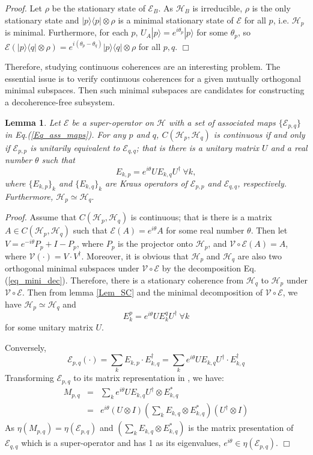 \documentclass[journal]{IEEEtran}
\def\h{\ensuremath{\mathcal{H}}}
\def\v{\ensuremath{\mathcal{V}}}
\def\e{\ensuremath{\mathcal{E}}}
\newtheorem{lemma}{Lemma}
\begin{document}
{\it Proof.} Let $\rho$ be the stationary state of $\e_B$. As $\h_B$ is irreducible, $\rho$ is the only stationary state and $|p\rangle\langle p|\otimes \rho$ is a minimal stationary state of $\e$ for all $p$, i.e. $\h_p$ is minimal. Furthermore, for each $p$, $U_A|p\rangle=e^{i\theta_p}|p\rangle$ for some $\theta_p$, so  $\e(|p\rangle\langle q|\otimes \rho)=e^{i(\theta_p-\theta_q)}|p\rangle\langle q|\otimes \rho$ for all $p,q.$
\hfill $\Box$

Therefore, studying continuous coherences are an interesting problem. The essential issue is to verify continuous coherences for a given mutually orthogonal minimal subspaces. Then such minimal subspaces are candidates for constructing a decoherence-free subsystem.
\begin{lemma}\label{lem_block_eq}
  Let $\e$ be a super-operator on $\h$ with a set of associated maps $\{\e_{p,q}\}$ in Eq.(\ref{Eq_ass_maps}). For any $p$ and $q$,  $C(\h_p,\h_q)$ is continuous if and only if $\e_{p,p}$ is unitarily equivalent to $\e_{q,q}$; that is there is a unitary matrix $U$ and a real number $\theta$ such that 
  $$E_{k,p}=e^{i\theta}UE_{k,q}U^\dagger \ \forall k,$$  where $\{E_{k,p}\}_k$ and $\{E_{k,q}\}_k$ are Kraus operators of $\e_{p,p}$ and $\e_{q,q}$, respectively.  Furthermore, $\h_p\simeq\h_q.$
\end{lemma}
{\it Proof.} 
Assume that $C(\h_p,\h_q)$ is continuous; that is  there is a matrix $A\in C(\h_p,\h_q)$ such that $\e(A)=e^{i\theta}A$ for some real number $\theta$. Then let $V=e^{-i\theta}P_p+I-P_p$, where $P_p$ is the projector onto $\h_p$,  and  $\v\circ\e(A)=A$, where $\v(\cdot)=V\cdot V^\dagger$. Moreover, it is obvious that $\h_p$ and $\h_q$ are also two orthogonal minimal subspaces under $\v\circ\e$  by the decomposition Eq.(\ref{eq_mini_dec}). Therefore, there is a stationary coherence from $\h_q$ to $\h_p$ under $\v\circ\e.$ Then from lemma \ref{Lem_SC} and the minimal decomposition of $\v\circ\e$, we have $\h_p\simeq\h_q$ and 
$$E_k^p=e^{i\theta }UE_k^qU^\dagger \ \forall k$$ for some unitary matrix $U$.

Conversely, $$\e_{p,q}(\cdot)=\sum_{k}E_{k,p}\cdot E_{k,q}^\dagger=\sum_{k}e^{i\theta}UE_{k,q}U^\dagger\cdot E_{k,q}^\dagger$$ 
Transforming $\e_{p,q}$ to its matrix representation in \cite{guan2016decomposition}, we have:
\begin{eqnarray*}
  M_{p,q}&=&\sum_k e^{i\theta}UE_{k,q}U^\dagger\otimes E_{k,q}^{*}\\
  &=&e^{i\theta}(U\otimes I)(\sum_k E_{k,q}\otimes E_{k,q}^{*})(U^\dagger\otimes I)
\end{eqnarray*}
As $\eta(M_{p,q})=\eta(\e_{p,q})$ and $(\sum_k E_{k,q}\otimes E_{k,q}^{*})$ is the matrix presentation of $\e_{q,q}$ which is a super-operator and has 1 as its eigenvalues, $e^{i\theta}\in\eta(\e_{p,q}).$  
\hfill $\Box$
\end{document}
